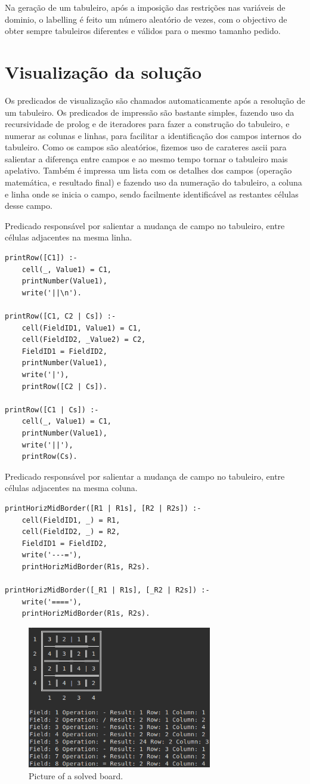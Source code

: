 \documentclass[runningheads,a4paper]{llncs}
\begin{document}
Na geração de um tabuleiro, após a imposição das restrições nas variáveis de dominio, o labelling é feito um número aleatório de vezes, com o objectivo de obter sempre tabuleiros diferentes e válidos para o mesmo tamanho pedido.

\section{Visualização da solução}
Os predicados de visualização são chamados automaticamente após a resolução de um tabuleiro.
Os predicados de impressão são bastante simples, fazendo uso da recursividade de prolog e de iteradores para fazer a construção do tabuleiro, e numerar as colunas e linhas, para facilitar a identificação dos campos internos do tabuleiro.
Como os campos são aleatórios, fizemos uso de carateres ascii para salientar a diferença entre campos e ao mesmo tempo tornar o tabuleiro mais apelativo. Também é impressa um lista com os detalhes dos campos (operação matemática, e resultado final) e fazendo uso da numeração do tabuleiro, a coluna e linha onde se inicia o campo, sendo facilmente identificável as restantes células desse campo.

Predicado responsável por salientar a mudança de campo no tabuleiro, entre células adjacentes na mesma linha.
\begin{verbatim}
printRow([C1]) :- 
	cell(_, Value1) = C1,  
	printNumber(Value1),
	write('||\n').

printRow([C1, C2 | Cs]) :- 
	cell(FieldID1, Value1) = C1, 
	cell(FieldID2, _Value2) = C2, 
	FieldID1 = FieldID2, 
	printNumber(Value1),
	write('|'), 
	printRow([C2 | Cs]).

printRow([C1 | Cs]) :- 
	cell(_, Value1) = C1,
	printNumber(Value1),
	write('||'), 
	printRow(Cs).
\end{verbatim}

Predicado responsável por salientar a mudança de campo no tabuleiro, entre células adjacentes na mesma coluna.
\begin{verbatim}
printHorizMidBorder([R1 | R1s], [R2 | R2s]) :- 
	cell(FieldID1, _) = R1, 
	cell(FieldID2, _) = R2, 
	FieldID1 = FieldID2, 
	write('---='), 
	printHorizMidBorder(R1s, R2s). 

printHorizMidBorder([_R1 | R1s], [_R2 | R2s]) :- 
	write('===='), 
	printHorizMidBorder(R1s, R2s).
\end{verbatim}

\begin{figure}
\centering
\includegraphics[height=6.2cm]{solve}
\caption{Picture of a solved board.}
\label{fig:example}
\end{figure}
\end{document}
